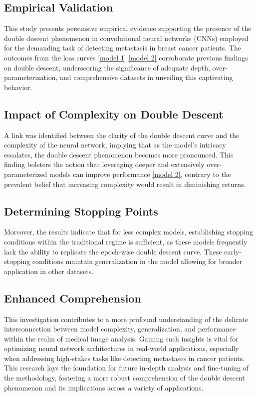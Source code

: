 \subsection{Empirical Validation}
This study presents persuasive empirical evidence supporting the presence of the double descent phenomenon in convolutional neural networks (CNNs) employed for the demanding task of detecting metastasis in breast cancer patients. The outcomes from the loss curves \ref{model 1} \ref{model 2} corroborate previous findings on double descent, underscoring the significance of adequate depth, over-parameterization, and comprehensive datasets in unveiling this captivating behavior.

\subsection{Impact of Complexity on Double Descent}
A link was identified between the clarity of the double descent curve and the complexity of the neural network, implying that as the model's intricacy escalates, the double descent phenomenon becomes more pronounced. This finding bolsters the notion that leveraging deeper and extensively over-parameterized models can improve performance \ref{model 2}, contrary to the prevalent belief that increasing complexity would result in diminishing returns.

\subsection{Determining Stopping Points}
Moreover, the results indicate that for less complex models, establishing stopping conditions within the traditional regime is sufficient, as these models frequently lack the ability to replicate the epoch-wise double descent curve. These early-stopping conditions maintain generalization in the model allowing for broader application in other datasets.

\subsection{Enhanced Comprehension}
This investigation contributes to a more profound understanding of the delicate interconnection between model complexity, generalization, and performance within the realm of medical image analysis. Gaining such insights is vital for optimizing neural network architectures in real-world applications, especially when addressing high-stakes tasks like detecting metastases in cancer patients. This research lays the foundation for future in-depth analysis and fine-tuning of the methodology, fostering a more robust comprehension of the double descent phenomenon and its implications across a variety of applications.